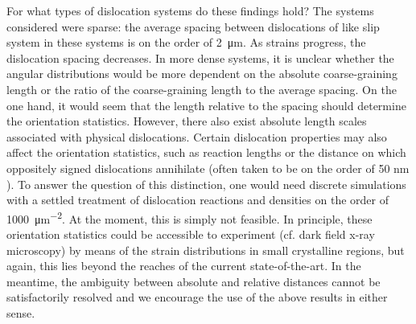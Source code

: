 For what types of dislocation systems do these findings hold? The systems considered were sparse: the average spacing between dislocations of like slip system in these systems is on the order of \SI{2}{\micro\metre}. As strains progress, the dislocation spacing decreases. In more dense systems, it is unclear whether the angular distributions would be more dependent on the absolute coarse-graining length or the ratio of the coarse-graining length to the average spacing. On the one hand, it would seem that the length relative to the spacing should determine the orientation statistics. However, there also exist absolute length scales associated with physical dislocations. Certain dislocation properties may also affect the orientation statistics, such as reaction lengths or the distance on which oppositely signed dislocations annihilate (often taken to be on the order of 50 nm \cite{Lin2021}). To answer the question of this distinction, one would need discrete simulations with a settled treatment of dislocation reactions and densities on the order of \SI{1000}{\micro\metre^{-2}}. At the moment, this is simply not feasible. In principle, these orientation statistics could be accessible to experiment (cf. dark field x-ray microscopy\cite{simonsDarkfieldXrayMicroscopy2015,poulsenGeometricalopticsFormalismModel2021,borgiSimulationsDislocationContrast2024}) by means of the strain distributions in small crystalline regions, but again, this lies beyond the reaches of the current state-of-the-art. In the meantime, the ambiguity between absolute and relative distances cannot be satisfactorily resolved and we encourage the use of the above results in either sense.

